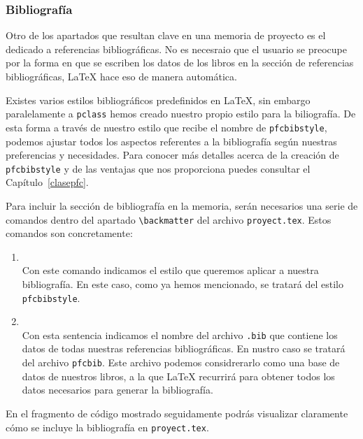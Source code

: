 

\subsubsection{Bibliograf\'ia}
Otro de los apartados que resultan clave en una memoria de proyecto es el dedicado a referencias bibliogr\'aficas.
No es necesraio que el usuario se preocupe por la forma en que se escriben los datos de los libros en la secci\'on de referencias bibliogr\'aficas, \LaTeX{} hace eso de manera autom\'atica. 

Existes varios estilos bibliogr\'aficos predefinidos en \LaTeX{}, sin embargo paralelamente a \texttt{pclass} hemos 
creado nuestro propio estilo para la biliograf\'ia. De esta forma a trav\'es de nuestro estilo que recibe el nombre de \texttt{pfcbibstyle}, podemos ajustar todos los aspectos referentes a la bibliograf\'ia seg\'un nuestras preferencias y necesidades. Para conocer m\'as detalles acerca de la creaci\'on de \texttt{pfcbibstyle} y de las ventajas que nos 
proporciona puedes consultar el Cap\'itulo~\ref{clasepfc}.

Para incluir la secci\'on de bibliograf\'ia en la memoria, ser\'an necesarios una serie de comandos dentro del apartado \verb+\backmatter+ del archivo \texttt{proyect.tex}. Estos comandos son concretamente: 
	
\begin{enumerate}
	\item \verb++\\
				Con este comando indicamos el estilo que queremos aplicar a nuestra bibliograf\'ia. En este caso, como ya hemos
				mencionado, se tratar\'a del estilo \texttt{pfcbibstyle}.  
	
	\item \verb++\\
				Con esta sentencia indicamos el nombre del archivo \texttt{.bib} que contiene los datos de todas nuestras referencias
				bibliogr\'aficas. En nustro caso se tratar\'a del archivo \texttt{pfcbib}. Este archivo podemos considrerarlo como 
				una base de datos de nuestros libros, a la que \LaTeX{} recurrir\'a para obtener todos los datos necesarios 
				para generar la bibliograf\'ia.
\end{enumerate}

En el fragmento de c\'odigo mostrado seguidamente podr\'as visualizar claramente c\'omo se incluye la bibliograf\'ia 
en \texttt{proyect.tex}.


 